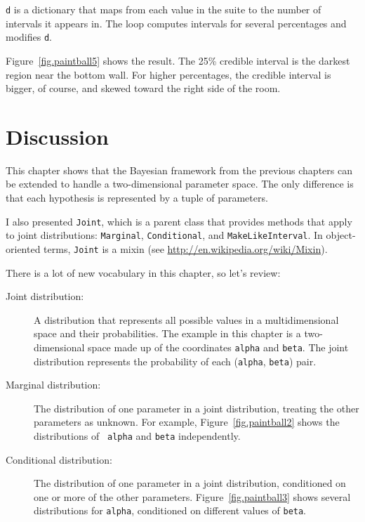 \documentclass[12pt]{book}
\theoremstyle{exercise}
\begin{document}
{\tt d} is a dictionary that maps from each value in the suite
to the number of intervals it appears in.  The loop computes intervals
for several percentages and modifies {\tt d}.

Figure~\ref{fig.paintball5} shows the result.  The 25\% credible
interval is the darkest region near the bottom wall.  For higher
percentages, the credible interval is bigger, of course, and skewed
toward the right side of the room.


\section{Discussion}

This chapter shows that the Bayesian framework from the previous
chapters can be extended to handle a two-dimensional parameter space.
The only difference is that each hypothesis is represented by
a tuple of parameters.

I also presented {\tt Joint}, which is a parent class that provides
methods that apply to joint distributions:
{\tt Marginal}, {\tt Conditional}, and {\tt MakeLikeInterval}.
In object-oriented terms,
{\tt Joint} is a mixin (see \url{http://en.wikipedia.org/wiki/Mixin}).

There is a lot of new vocabulary in this chapter, so let's review:

\begin{description}

\item[Joint distribution:] A distribution that represents all possible
  values in a multidimensional space and their probabilities.  The
  example in this chapter is a two-dimensional space made up of the
  coordinates {\tt alpha} and {\tt beta}.  The joint distribution
  represents the probability of each ({\tt alpha}, {\tt beta}) pair.

\item[Marginal distribution:] The distribution of one parameter in a
  joint distribution, treating the other parameters as unknown.  For
  example, Figure~\ref{fig.paintball2} shows the distributions of {\tt
    alpha} and {\tt beta} independently.

\item[Conditional distribution:] The distribution of one parameter in
  a joint distribution, conditioned on one or more of the other
  parameters.  Figure~\ref{fig.paintball3} shows several distributions for
  {\tt alpha}, conditioned on different values of {\tt beta}.

\end{description}
\end{document}
